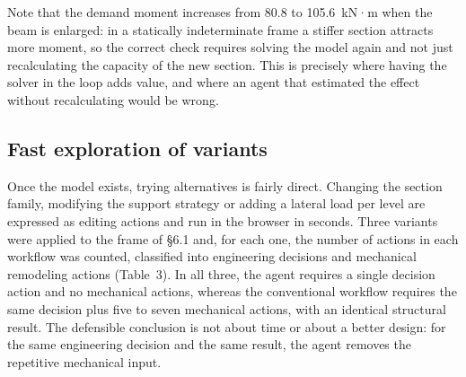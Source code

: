 \documentclass[11pt,a4paper]{article}
\begin{document}
Note that the demand moment increases from 80.8 to 105.6~kN·m when the beam is enlarged: in a statically indeterminate frame a stiffer section attracts more moment, so the correct check requires solving the model again and not just recalculating the capacity of the new section. This is precisely where having the solver in the loop adds value, and where an agent that estimated the effect without recalculating would be wrong.

\subsection{Fast exploration of variants}\label{sec:6.2}

Once the model exists, trying alternatives is fairly direct. Changing the section family, modifying the support strategy or adding a lateral load per level are expressed as editing actions and run in the browser in seconds. Three variants were applied to the frame of §6.1 and, for each one, the number of actions in each workflow was counted, classified into engineering decisions and mechanical remodeling actions (Table~3). In all three, the agent requires a single decision action and no mechanical actions, whereas the conventional workflow requires the same decision plus five to seven mechanical actions, with an identical structural result. The defensible conclusion is not about time or about a better design: for the same engineering decision and the same result, the agent removes the repetitive mechanical input.
\end{document}

